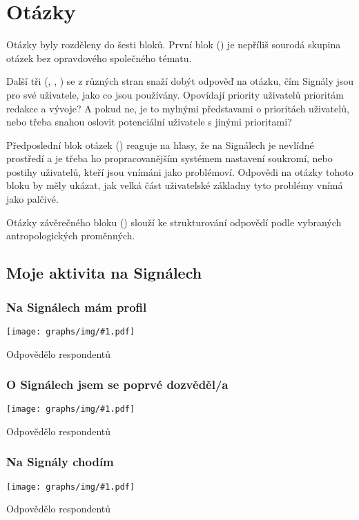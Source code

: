 \documentclass[12pt, a4paper, twoside]{article}
\newcommand{\answercount}[1]{Odpovědělo  respondentů}
\newcommand{\includegraph}[1]{
  \texttt{[image: graphs/img/\#1.pdf]}

  \answercount{#1}
}
\begin{document}
\section{Otázky}

Otázky byly rozděleny do šesti bloků.
První blok ()
je nepříliš sourodá skupina otázek bez opravdového společného tématu.

Další tři
(, , )
se z různých stran snaží dobýt odpověď na otázku, čím Signály jsou
pro své uživatele, jako co jsou používány.
Opovídají priority uživatelů prioritám redakce a vývoje?
A pokud ne, je to mylnými představami o prioritách uživatelů,
nebo třeba snahou oslovit potenciální uživatele s jinými prioritami?

Předposlední blok otázek ()
reaguje na hlasy, že na Signálech je nevlídné prostředí
a je třeba ho  propracovanějším systémem nastavení
soukromí, nebo postihy uživatelů, kteří jsou vnímáni jako problémoví.
Odpovědi na otázky tohoto bloku by měly ukázat, jak velká část
uživatelské základny tyto problémy vnímá jako palčivé.

Otázky závěrečného bloku ()
slouží ke strukturování odpovědí
podle vybraných antropologických proměnných.

\subsection{Moje aktivita na Signálech}\label{sec:mojeaktivita}

\subsubsection{Na Signálech mám profil}

\includegraph{na_signalech_mam_profil}

\subsubsection{O Signálech jsem se poprvé dozvěděl/a}

\includegraph{o_signalech_jsem_se_poprve_dozvedel}

\subsubsection{Na Signály chodím}

\includegraph{na_signaly_chodim}
\end{document}
